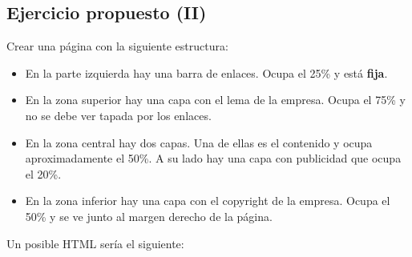 \documentclass[letterpaper,10pt,spanish]{sphinxmanual}
\begin{document}
\subsection{Ejercicio propuesto (II)}
\label{tema3:ejercicio-propuesto-ii}
Crear una página con la siguiente estructura:
\begin{itemize}
\item {} 
En la parte izquierda hay una barra de enlaces. Ocupa el 25\% y está \textbf{fija}.

\item {} 
En la zona superior hay una capa con el lema de la empresa. Ocupa el 75\% y no se debe ver tapada por los enlaces.

\item {} 
En la zona central hay dos capas. Una de ellas es el contenido y ocupa aproximadamente el 50\%. A su lado hay una capa con publicidad que ocupa el 20\%.

\item {} 
En la zona inferior hay una capa con el copyright de la empresa. Ocupa el 50\% y se ve junto al margen derecho de la página.

\end{itemize}

Un posible HTML sería el siguiente:
\end{document}
